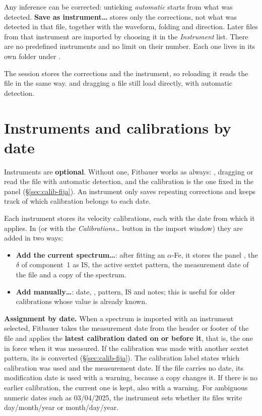 Any inference can be corrected: unticking \emph{automatic} starts from what was
detected. \textbf{Save as instrument…} stores only the corrections, not what was
detected in that file, together with the waveform, folding and direction. Later
files from that instrument are imported by choosing it in the \emph{Instrument}
list. There are no predefined instruments and no limit on their number. Each one
lives in its own folder under
.

The session stores the corrections and the instrument, so reloading it reads the
file in the same way.  and dragging a file still load
directly, with automatic detection.

\section{Instruments and calibrations by date}
\label{sec:equipos-calibraciones}

Instruments are \textbf{optional}. Without one, Fitbauer works as always:
, dragging or  read the file with automatic
detection, and the calibration is the one fixed in the panel (§\ref{sec:calib-fija}).
An instrument only saves repeating corrections and keeps track of which
calibration belongs to each date.

Each instrument stores its velocity calibrations, each with the date from which
it applies. In  (or with the
\emph{Calibrations…} button in the import window) they are added in two ways:

\begin{itemize}[nosep]
  \item \textbf{Add the current spectrum…}: after fitting an $\alpha$-Fe, it stores the
    panel , the $\delta$ of component~1 as IS, the active sextet pattern,
    the measurement date of the file and a copy of the spectrum.
  \item \textbf{Add manually…}: date, , pattern, IS and notes; this
    is useful for older calibrations whose value is already known.
\end{itemize}

\textbf{Assignment by date.} When a spectrum is imported with an instrument
selected, Fitbauer takes the measurement date from the header or footer of the
file and applies the \textbf{latest calibration dated on or before it}, that is,
the one in force when it was measured. If the calibration was made with another
sextet pattern, its  is converted (§\ref{sec:calib-fija}). The
calibration label states which calibration was used and the measurement date. If
the file carries no date, its modification date is used with a warning, because a
copy changes it. If there is no earlier calibration, the current one is kept,
also with a warning. For ambiguous numeric dates such as 03/04/2025, the
instrument sets whether its files write day/month/year or month/day/year.


